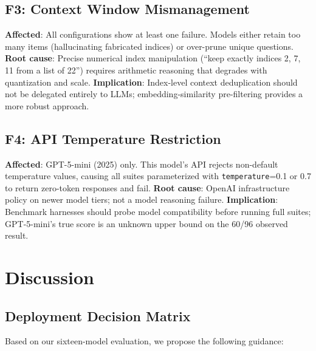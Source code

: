 \documentclass[onecolumn,10pt]{IEEEtran}
\begin{document}
\subsection{F3: Context Window Mismanagement}
\textbf{Affected}: All configurations show at least one failure.
Models either retain too many items (hallucinating fabricated indices)
or over-prune unique questions.
\textbf{Root cause}: Precise numerical index manipulation (``keep
exactly indices 2, 7, 11 from a list of 22'') requires arithmetic
reasoning that degrades with quantization and scale.
\textbf{Implication}: Index-level context deduplication should not be
delegated entirely to LLMs; embedding-similarity pre-filtering
provides a more robust approach.

\subsection{F4: API Temperature Restriction}
\textbf{Affected}: GPT-5-mini (2025) only. This model's API rejects
non-default temperature values, causing all suites parameterized with
\texttt{temperature}=0.1 or 0.7 to return zero-token responses and fail.
\textbf{Root cause}: OpenAI infrastructure policy on newer model tiers;
not a model reasoning failure.
\textbf{Implication}: Benchmark harnesses should probe model compatibility
before running full suites; GPT-5-mini's true score is an unknown
upper bound on the 60/96 observed result.


\section{Discussion}

\subsection{Deployment Decision Matrix}

Based on our sixteen-model evaluation, we propose the following guidance:
\end{document}
